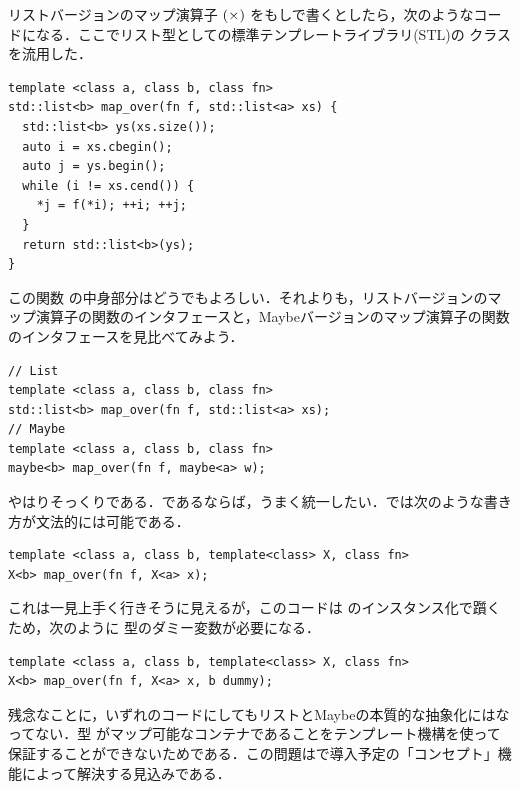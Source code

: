 \documentclass[a5paper,twoside,fleqn,draft]{jsbook}
\begin{document}
リストバージョンのマップ演算子 $(\operatorname{\times})$ をもし\cxx で書くとしたら，次のようなコードになる．ここでリスト型として\cxx の標準テンプレートライブラリ(STL)の  クラスを流用した．
\begin{cxxcode}
\begin{verbatim}
template <class a, class b, class fn>
std::list<b> map_over(fn f, std::list<a> xs) {
  std::list<b> ys(xs.size());
  auto i = xs.cbegin();
  auto j = ys.begin();
  while (i != xs.cend()) {
    *j = f(*i); ++i; ++j;
  }
  return std::list<b>(ys);
}
\end{verbatim}
\end{cxxcode}
この関数  の中身部分はどうでもよろしい．それよりも，リストバージョンのマップ演算子の\cxx 関数のインタフェースと，Maybeバージョンのマップ演算子の\cxx 関数のインタフェースを見比べてみよう．
\begin{cxxcode}
\begin{verbatim}
// List
template <class a, class b, class fn>
std::list<b> map_over(fn f, std::list<a> xs);
// Maybe
template <class a, class b, class fn>
maybe<b> map_over(fn f, maybe<a> w);
\end{verbatim}
\end{cxxcode}
やはりそっくりである．であるならば，うまく統一したい．\cxx では次のような書き方が文法的には可能である．
\begin{cxxcode}
\begin{verbatim}
template <class a, class b, template<class> X, class fn>
X<b> map_over(fn f, X<a> x);
\end{verbatim}
\end{cxxcode}
これは一見上手く行きそうに見えるが，このコードは  のインスタンス化で躓くため，次のように  型のダミー変数が必要になる．
\begin{cxxcode}
\begin{verbatim}
template <class a, class b, template<class> X, class fn>
X<b> map_over(fn f, X<a> x, b dummy);
\end{verbatim}
\end{cxxcode}
残念なことに，いずれのコードにしてもリストとMaybeの本質的な抽象化にはなってない．型  がマップ可能なコンテナであることをテンプレート機構を使って保証することができないためである．この問題は\cxxtwelve で導入予定の「コンセプト」機能によって解決する見込みである．

\end{document}

